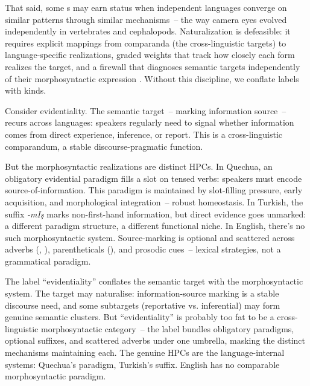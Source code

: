 That said, some s may earn  status when independent languages converge on similar patterns through similar mechanisms~-- the way camera eyes evolved independently in vertebrates and cephalopods. Naturalization is defeasible: it requires explicit mappings from comparanda (the cross-linguistic targets) to language-specific realizations, graded weights that track how closely each form realizes the target, and a firewall that diagnoses semantic targets independently of their morphosyntactic expression \parencite[see][for formal development]{reynolds2025comparanda}. Without this discipline, we conflate labels with kinds.

Consider evidentiality. The semantic target~-- marking information source~-- recurs across languages: speakers regularly need to signal whether information comes from direct experience, inference, or report. This is a cross-linguistic comparandum, a stable discourse-pragmatic function.

But the morphosyntactic realizations are distinct HPCs. In Quechua, an obligatory evidential paradigm fills a slot on tensed verbs: speakers must encode source-of-information. This paradigm is maintained by slot-filling pressure, early acquisition, and morphological integration~-- robust homeostasis. In Turkish, the suffix \textit{-mI\c{s}} marks non-first-hand information, but direct evidence goes unmarked: a different paradigm structure, a different functional niche. In English, there's no such morphosyntactic system. Source-marking is optional and scattered across adverbs (, ), parentheticals (), and prosodic cues~-- lexical strategies, not a grammatical paradigm.

The label \enquote{evidentiality} conflates the semantic target with the morphosyntactic system. The target may naturalise: information-source marking is a stable discourse need, and some subtargets (reportative vs. inferential) may form genuine semantic clusters. But \enquote{evidentiality} is probably too fat to be a cross-linguistic morphosyntactic category~-- the label bundles obligatory paradigms, optional suffixes, and scattered adverbs under one umbrella, masking the distinct mechanisms maintaining each. The genuine HPCs are the language-internal systems: Quechua's paradigm, Turkish's suffix. English has no comparable morphosyntactic paradigm.

